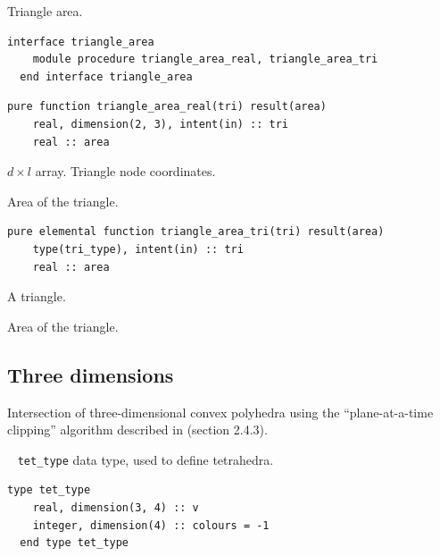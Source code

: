 \documentclass{article}
\begin{document}
\noindent Triangle area.

\begin{lstlisting}[language=FORTRAN]
  interface triangle_area
    module procedure triangle_area_real, triangle_area_tri
  end interface triangle_area
\end{lstlisting}

\begin{lstlisting}[language=FORTRAN]
  pure function triangle_area_real(tri) result(area)
    real, dimension(2, 3), intent(in) :: tri
    real :: area
\end{lstlisting}

\begin{description}[font=\ttfamily\bfseries,leftmargin=2.2\parindent,labelindent=1.7\parindent,noitemsep]
  \item[tri] $d \times l$ array. Triangle node coordinates.
  \item[area] Area of the triangle.
\end{description}

\begin{lstlisting}[language=FORTRAN]
  pure elemental function triangle_area_tri(tri) result(area)
    type(tri_type), intent(in) :: tri
    real :: area
\end{lstlisting}

\begin{description}[font=\ttfamily\bfseries,leftmargin=2.2\parindent,labelindent=1.7\parindent,noitemsep]
  \item[tri] A triangle.
  \item[area] Area of the triangle.
\end{description}

\subsection{Three dimensions}\label{sect:3D_intersection}

Intersection of three-dimensional convex polyhedra using the ``plane-at-a-time
clipping'' algorithm described in \citet{eberly2007} (section 2.4.3).

~\newline
\verb+tet_type+ data type, used to define tetrahedra.

\begin{lstlisting}[language=FORTRAN]
  type tet_type
    real, dimension(3, 4) :: v
    integer, dimension(4) :: colours = -1
  end type tet_type
\end{lstlisting}
\end{document}
